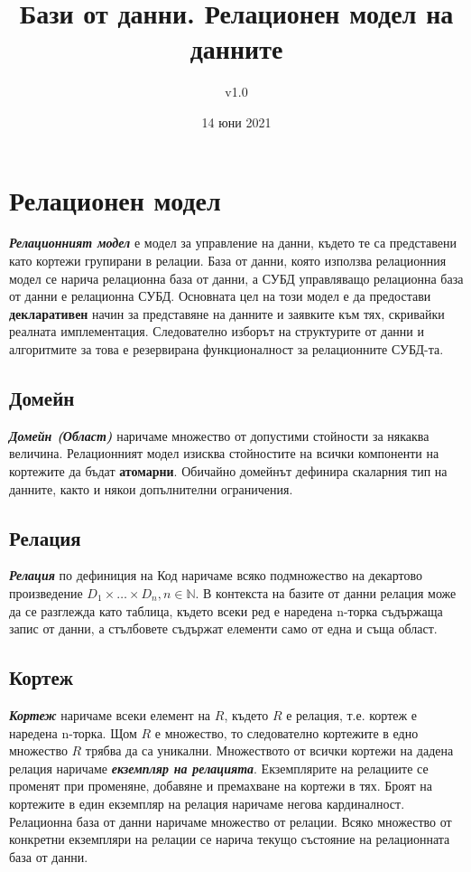 \documentclass[fleqn,12pt]{article}
\title{Бази от данни. Релационен модел на данните}
\author{v1.0}
\date{14 юни 2021}
\begin{document}
\maketitle

\tableofcontents
\pagebreak

\section{Релационен модел}

\textit{\textbf{Релационният модел}} е модел за управление на данни, където те са представени като кортежи групирани в релации.
База от данни, която използва релационния модел се нарича релационна база от данни, а СУБД управляващо релационна база от данни е релационна СУБД.
\bigbreak
Основната цел на този модел е да предостави \textbf{декларативен} начин за представяне на данните и заявките към тях, скривайки реалната имплементация.
Следователно изборът на структурите от данни и алгоритмите за това е резервирана функционалност за релационните СУБД-та.

\subsection{Домейн}

\textbf{\textit{Домейн (Област)}} наричаме множество от допустими стойности за някаква величина.
\bigbreak
Релационният модел изисква стойностите на всички компоненти на кортежите да бъдат \textbf{атомарни}.
Обичайно домейнът дефинира скаларния тип на данните, както и някои допълнителни ограничения.

\subsection{Релация}

\textbf{\textit{Релация}} по дефиниция на Код наричаме всяко подмножество на декартово произведение $D_1 \times \dots \times D_n, n \in \mathbb{N}$.
В контекста на базите от данни релация може да се разглежда като таблица, където всеки ред е наредена n-торка съдържаща запис от данни, а стълбовете съдържат елементи само от една и съща област.

\subsection{Кортеж}

\textbf{\textit{Кортеж}} наричаме всеки елемент на $R$, където $R$ е релация, т.е. кортеж е наредена n-торка.
Щом $R$ е множество, то следователно кортежите в едно множество $R$ трябва да са уникални.
\bigbreak
Множеството от всички кортежи на дадена релация наричаме \textit{\textbf{екземпляр на релацията}}.
Екземплярите на релациите се променят при променяне, добавяне и премахване на кортежи в тях.
Броят на кортежите в един екземпляр на релация наричаме негова кардиналност.
\bigbreak
Релационна база от данни наричаме множество от релации.
Всяко множество от конкретни екземпляри на релации се нарича текущо състояние на релационната база от данни.
\end{document}
